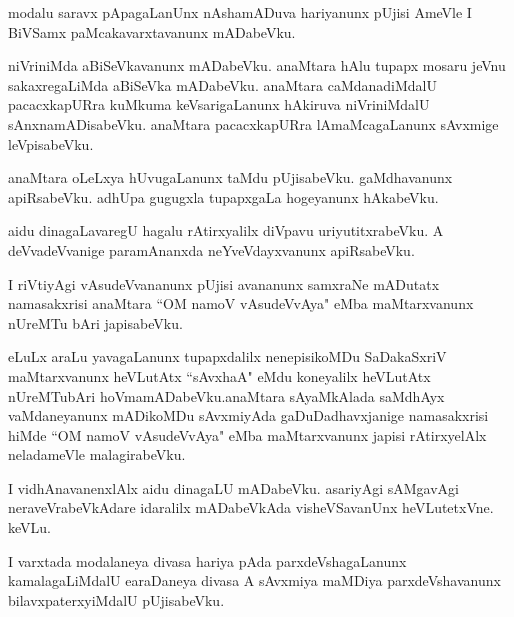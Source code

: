 \documentclass{article}
\begin{document}
\begin{mn}%
modalu saravx pApagaLanUnx nAshamADuva hariyanunx pUjisi AmeVle I BiVSamx paMcakavarxtavanunx 
mADabeVku.
\end{mn}

\begin{mn}%
niVriniMda aBiSeVkavanunx mADabeVku. anaMtara hAlu tupapx mosaru jeVnu sakaxregaLiMda aBiSeVka 
mADabeVku. anaMtara caMdanadiMdalU pacacxkapURra kuMkuma keVsarigaLanunx hAkiruva niVriniMdalU 
sAnxnamADisabeVku. anaMtara pacacxkapURra lAmaMcagaLanunx sAvxmige leVpisabeVku.
\end{mn}

\begin{mn}%
anaMtara oLeLxya hUvugaLanunx taMdu pUjisabeVku. gaMdhavanunx apiRsabeVku. adhUpa gugugxla 
tupapxgaLa hogeyanunx hAkabeVku.
\end{mn}

\begin{mn}%
aidu dinagaLavaregU hagalu rAtirxyalilx diVpavu uriyutitxrabeVku. A deVvadeVvanige paramAnanxda 
neYveVdayxvanunx apiRsabeVku.
\end{mn}

\begin{mn}%
I riVtiyAgi vAsudeVvananunx pUjisi avananunx samxraNe mADutatx namasakxrisi anaMtara ``OM namoV 
vAsudeVvAya" eMba maMtarxvanunx nUreMTu bAri japisabeVku.
\end{mn}

\begin{mn}%
eLuLx araLu yavagaLanunx tupapxdalilx nenepisikoMDu SaDakaSxriV maMtarxvanunx heVLutAtx ``sAvxhaA" 
eMdu koneyalilx heVLutAtx nUreMTubAri hoVmamADabeVku.anaMtara sAyaMkAlada saMdhAyx vaMdaneyanunx 
mADikoMDu sAvxmiyAda gaDuDadhavxjanige namasakxrisi hiMde ``OM namoV vAsudeVvAya" eMba 
maMtarxvanunx japisi rAtirxyelAlx neladameVle malagirabeVku.
\end{mn}

\begin{mn}%
I vidhAnavanenxlAlx aidu dinagaLU mADabeVku. asariyAgi sAMgavAgi neraveVrabeVkAdare idaralilx 
mADabeVkAda visheVSavanUnx heVLutetxVne. keVLu.
\end{mn}

\begin{mn}%
I varxtada modalaneya divasa hariya pAda parxdeVshagaLanunx kamalagaLiMdalU earaDaneya divasa A 
sAvxmiya maMDiya parxdeVshavanunx bilavxpaterxyiMdalU pUjisabeVku.
\end{mn}
\end{document}
